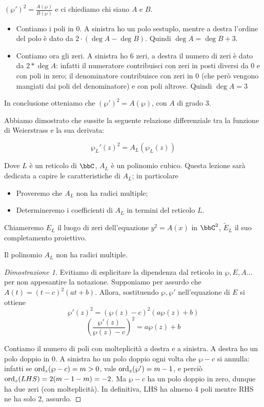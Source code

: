 $(\wp')^2=\frac{A(\wp)}{B(\wp)}$ e ci chiediamo chi siano $A$ e $B$.

\begin{itemize}
 \item Contiamo i poli in 0. A sinistra ho un polo sestuplo, mentre a destra l'ordine del polo è dato da $2\cdot (\deg A - \deg B)$. Quindi $\deg A = \deg B + 3$.
 \item Contiamo ora gli zeri. A sinistra ho 6 zeri, a destra il numero di zeri è dato da $2*\deg A$: infatti il numeratore contribuisci con zeri in posti diversi da 0 e con poli in zero; il denominatore contribuisce con zeri in 0 (che però vengono mangiati dai poli del denominatore) e con poli altrove. Quindi $\deg A = 3$
\end{itemize}

In conclusione otteniamo che $(\wp')^2=A(\wp)$, con $A$ di grado 3.


Abbiamo dimostrato che sussite la seguente relazione differenziale tra la funzione di Weierstrass e la sua derivata:

$$\wp_L'(z)^2 = A_L(\wp_L(z)) $$

Dove $L$ è un reticolo di $\bbC$,  $A_L$ è un polinomio cubico. Questa lezione sarà dedicata a capire le caratteristiche di $A_L$; in particolare
\begin{itemize}
\item Proveremo che $A_L$ non ha radici multiple;
\item Determineremo i coefficienti di $A_L$ in termini del reticolo $L$.
\end{itemize}

Chiameremo $E_L$ il luogo di zeri dell'equazione $y^2=A(x)$ in $\bbC^2$, $\tilde{E}_L$ il suo completamento proiettivo.
\begin{proposizione}
Il polinomio $A_L$ non ha radici multiple.
\end{proposizione}

\begin{proof}[Dimostrazione 1]
Evitiamo di esplicitare la dipendenza dal reticolo in $\wp, E,A \dots$ per non appesantire la notazione. Supponiamo per assurdo che $A(t) = (t-c)^2(at+b)$. Allora, sostituendo $\wp, \wp'$ nell'equazione di $E$ si ottiene
$$\wp'(z)^2 = (\wp(z) - c)^2(a\wp(z)+b) $$
$$ \left ( \frac{\wp'(z)}{\wp(z)-c} \right )^2 = a\wp(z)+b $$

Contiamo il numero di poli con molteplicità a destra e a sinistra. A destra ho un polo doppio in $0$. A sinistra ho un polo doppio ogni volta che $\wp - c$ si annulla: infatti se $\text{ord}_{z}(\wp -c) = m > 0$, vale $\text{ord}_{z}(\wp') = m-1$, e perciò $\text{ord}_{z}(LHS) = 2(m-1-m) = -2$. Ma $\wp-c$ ha un polo doppio in zero, dunque ha due zeri (con molteplicità). In definitiva, LHS ha almeno 4 poli mentre RHS ne ha solo 2, assurdo.
\end{proof}


